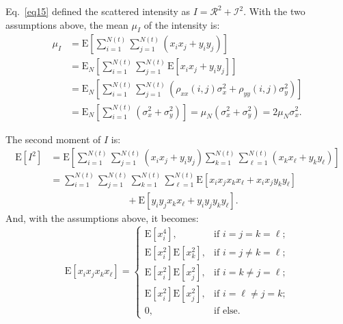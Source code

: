 \documentclass[journal]{IEEEtran}
\begin{document}
Eq.~\eqref{eq15} defined the scattered intensity as $I = \mathcal{R}^{2} + \mathcal{I}^{2}$.
With the two assumptions above, the mean $\mu_I$ of the intensity is:
\begin{align}
\mu_{I} & = \mathrm{E}\left[\sum_{i=1}^{N(t)} \sum_{j=1}^{N(t)}\left(x_{i} x_{j}+y_{i} y_{j}\right)\right] \nonumber\\
& = \mathrm{E}_{N}\left[\sum_{i=1}^{N(t)} \sum_{j=1}^{N(t)} \mathrm{E}\left[x_{i} x_{j}+y_{i} y_{j}\right]\right] \nonumber\\
& = \mathrm{E}_{N}\left[\sum_{i=1}^{N(t)} \sum_{j=1}^{N(t)}\left(\rho_{x x}(i, j) \sigma_{x}^{2}+\rho_{y y}(i, j) \sigma_{y}^{2}\right)\right] \nonumber\\
& = \mathrm{E}_{N}\left[\sum_{i=1}^{N(t)}\left(\sigma_{x}^{2}+
\sigma_{y}^{2}\right)\right] = \mu_{N}\left(\sigma_{x}^{2}+\sigma_{y}^{2}\right)
= 2 \mu_{N} \sigma_{x}^{2}.
\label{eqA5}
\end{align}

The second moment of $I$ is:
\begin{align}
\mathrm{E}\left[I^{2}\right] & = \mathrm{E}\left[\sum_{i=1}^{N(t)} \sum_{j=1}^{N(t)}\left(x_{i} x_{j}+y_{i} y_{j}\right) \sum_{k=1}^{N(t) }\sum_{\ell=1}^{N(t)}\left(x_{k} x_{\ell} + y_{k} y_{\ell}\right)\right] \nonumber\\
& = \sum_{i=1}^{N(t)} \sum_{j=1}^{N(t)} \sum_{k=1}^{N(t)} \sum_{\ell=1}^{N(t)}
\mathrm{E}\left[x_{i} x_{j} x_{k} x_{\ell}+x_{i} x_{j} y_{k} y_{\ell}\right] \nonumber\\
& \qquad \qquad \qquad \qquad + \mathrm{E}\left[y_{i} y_{j} x_{k} x_{\ell}+y_{i} y_{j} y_{k} y_{\ell}\right].
\label{eqA6}
\end{align}
And, with the assumptions above, it becomes:
\begin{equation}
\mathrm{E}\left[x_{i} x_{j} x_{k} x_{\ell}\right] = \begin{cases}
\mathrm{E}\left[x_{i}^{4}\right], & \text{if } i=j=k=\ell; \\
\mathrm{E}\left[x_{i}^{2}\right] \mathrm{E}\left[x_{k}^{2}\right], & \text{if } i=j \neq k=\ell; \\
\mathrm{E}\left[x_{i}^{2}\right] \mathrm{E}\left[x_{j}^{2}\right], &  \text{if } i=k \neq j=\ell; \\
\mathrm{E}\left[x_{i}^{2}\right] \mathrm{E}\left[x_{j}^{2}\right], &  \text{if } i=\ell \neq j=k; \\
0, & \text{if } \text {else}.
\label{eqA7}
\end{cases}
\end{equation}
\end{document}
